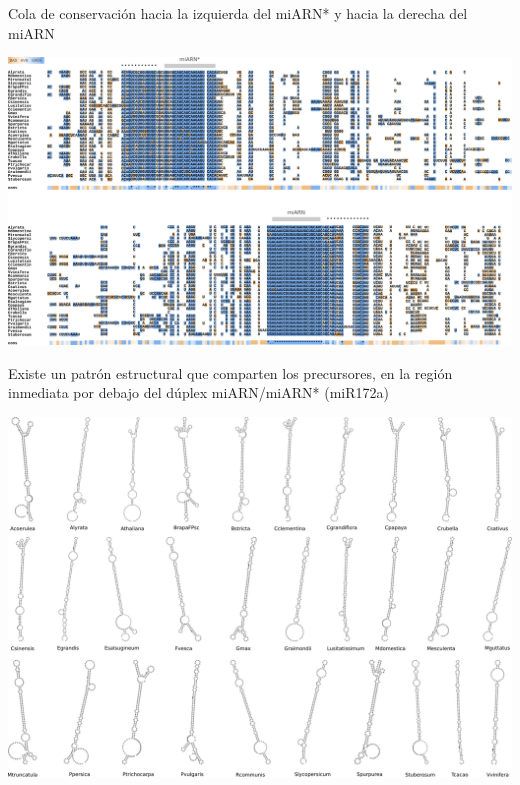 \documentclass{beamer}
\begin{document}
\begin{frame}{Cola de conservación hacia la izquierda del miARN* y hacia la derecha del miARN}
	\begin{center}
		\includegraphics[width=1\textwidth]{img/miR172a_tcoffee_03.png}
	\end{center}
\end{frame}

\begin{frame}{Existe un patrón estructural que comparten los precursores, en la región inmediata por debajo del dúplex miARN/miARN* (miR172a)}
	\begin{center}
		\includegraphics[width=.8\textwidth]{img/miR172a_rnafold.png}
	\end{center}
    \begin{center}
    \end{center}
\end{frame}
\end{document}
